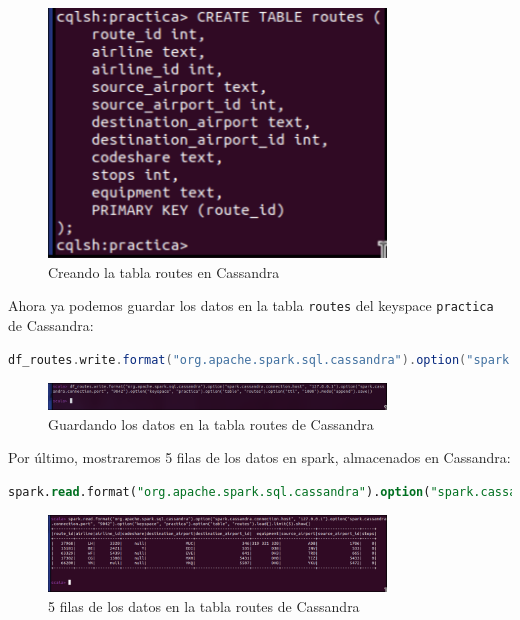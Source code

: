 \begin{figure}[H]
    \centering
    \includegraphics[width=0.8\textwidth]{figures/55.png}
    \caption{Creando la tabla routes en Cassandra}
    \label{fig:create_routes_table}
\end{figure}

Ahora ya podemos guardar los datos en la tabla \texttt{routes} del keyspace \texttt{practica} de Cassandra:

\begin{lstlisting}[language=scala]
df_routes.write.format("org.apache.spark.sql.cassandra").option("spark.cassandra.connection.host", "127.0.0.1").option("spark.cassandra.connection.port", "9042").option("keyspace", "practica").option("table", "routes").option("ttl", "1000").mode("append").save()
\end{lstlisting}

\begin{figure}[H]
    \centering
    \includegraphics[width=0.8\textwidth]{figures/56.png}
    \caption{Guardando los datos en la tabla routes de Cassandra}
    \label{fig:save_routes_cassandra}
\end{figure}

Por último, mostraremos 5 filas de los datos en spark, almacenados en Cassandra:

\begin{lstlisting}[language=sql]
spark.read.format("org.apache.spark.sql.cassandra").option("spark.cassandra.connection.host", "127.0.0.1").option("spark.cassandra.connection.port", "9042").option("keyspace", "practica").option("table", "routes").load().limit(5).show()
\end{lstlisting}

\begin{figure}[H]
    \centering
    \includegraphics[width=0.8\textwidth]{figures/57.png}
    \caption{5 filas de los datos en la tabla routes de Cassandra}
    \label{fig:routes_cassandra_data}
\end{figure}
